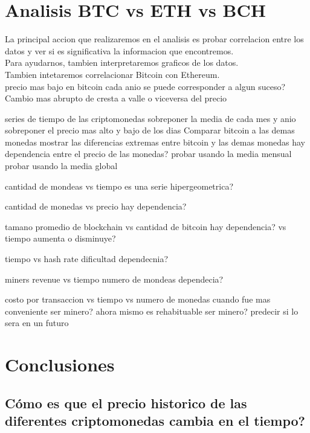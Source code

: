 \documentclass[12pt,letterpaper]{article}
\begin{document}
\section*{Analisis BTC vs ETH vs BCH}
    La principal accion que realizaremos en el analisis es probar correlacion entre los datos y ver si es significativa la informacion que encontremos.
    \\
    Para ayudarnos, tambien interpretaremos graficos de los datos.
    \\
    Tambien intetaremos correlacionar Bitcoin con Ethereum.
    \\
    precio mas bajo en bitcoin cada anio
        se puede corresponder a algun suceso?
    Cambio mas abrupto de cresta a valle o viceversa del precio

    series de tiempo de las criptomonedas
        sobreponer la media de cada mes y anio
    sobreponer el precio mas alto y bajo de los dias
    Comparar bitcoin a las demas monedas
        mostrar las diferencias extremas entre bitcoin y las demas monedas
    hay dependencia entre el precio de las monedas?
        probar usando la media mensual
        probar usando la media global

    cantidad de mondeas vs tiempo
        es una serie hipergeometrica?

    cantidad de monedas vs precio
        hay dependencia?

    tamano promedio de blockchain
        vs cantidad de bitcoin
            hay dependencia?
        vs tiempo
            aumenta o disminuye?

    tiempo vs hash rate
        dificultad
            dependecnia?

    miners revenue vs tiempo
        numero de mondeas
         dependecia?

    costo por transaccion vs tiempo
        vs numero de monedas
            cuando fue mas conveniente ser minero?
            ahora mismo es rehabituable ser minero?
                predecir si lo sera en un futuro

\section*{Conclusiones}

	\subsection*{C\'omo es que el precio historico de las diferentes criptomonedas cambia en el tiempo?}
\end{document}
